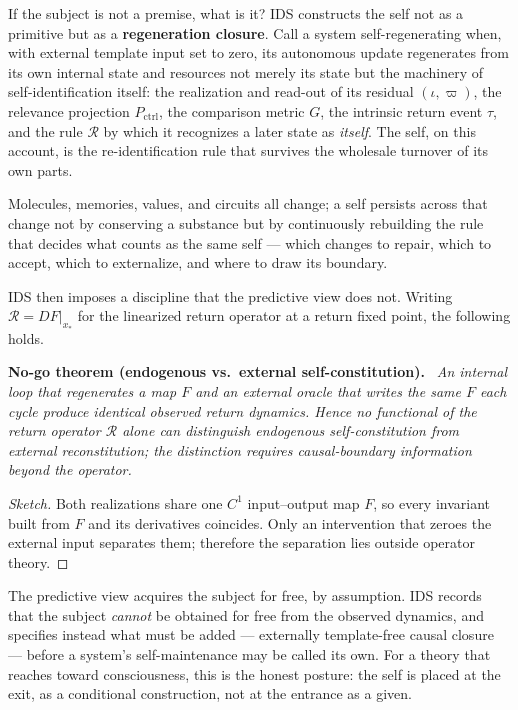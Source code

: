 \documentclass[11pt,a4paper]{article}
\newenvironment{namedthm}[1]{\par\addvspace{\medskipamount}\noindent\textbf{#1.}\ \itshape\ignorespaces}{\par\addvspace{\medskipamount}}
\theoremstyle{plain}
\begin{document}
If the subject is not a premise, what is it? IDS constructs the self not as a primitive but as a
\textbf{regeneration closure}. Call a system self-regenerating when, with external template input set to
zero, its autonomous update regenerates from its own internal state and resources not merely its state
but the machinery of self-identification itself: the realization and read-out of its residual
$(\iota,\varpi)$, the relevance projection $P_{\mathrm{ctrl}}$, the comparison metric $G$, the intrinsic
return event $\tau$, and the rule $\mathscr R$ by which it recognizes a later state as \emph{itself}. The
self, on this account, is the re-identification rule that survives the wholesale turnover of its own
parts.

Molecules, memories, values, and circuits all change; a self persists across that change not by
conserving a substance but by continuously rebuilding the rule that decides what counts as the same
self --- which changes to repair, which to accept, which to externalize, and where to draw its boundary.

IDS then imposes a discipline that the predictive view does not. Writing $\mathscr R=DF|_{x_\ast}$ for
the linearized return operator at a return fixed point, the following holds.

\begin{namedthm}{No-go theorem (endogenous vs.\ external self-constitution)}
An internal loop that regenerates a map $F$ and an external oracle that writes the same $F$ each cycle
produce identical observed return dynamics. Hence no functional of the return operator $\mathscr R$
alone can distinguish endogenous self-constitution from external reconstitution; the distinction
requires causal-boundary information beyond the operator.
\end{namedthm}

\begin{proof}[Sketch]
Both realizations share one $C^1$ input--output map $F$, so every invariant built from $F$ and its
derivatives coincides. Only an intervention that zeroes the external input separates them; therefore the
separation lies outside operator theory.
\end{proof}

The predictive view acquires the subject for free, by assumption. IDS records that the subject
\emph{cannot} be obtained for free from the observed dynamics, and specifies instead what must be added
--- externally template-free causal closure --- before a system's self-maintenance may be called its own.
For a theory that reaches toward consciousness, this is the honest posture: the self is placed at the
exit, as a conditional construction, not at the entrance as a given.
\end{document}

